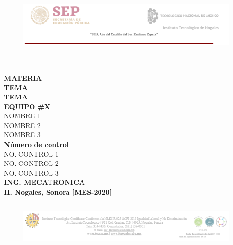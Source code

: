 \documentclass[hidelinks,12pt]{article}
\begin{document}
\begin{titlepage}
\begin{center}
\begin{figure}
	\includegraphics[width=17.5cm,height=3.3cm]{assets/images/00_HEADER}
\end{figure}
\vspace*{1\baselineskip}
{
	\bf{}\\
}
\vspace*{1\baselineskip}
\large{\textbf{MATERIA}}\\
\vspace*{1\baselineskip}
\large{\textbf{TEMA}}\\
\large{\textbf{TEMA}}\\
\vspace*{1\baselineskip}
\large{\textbf{EQUIPO \#X}}\\
NOMBRE 1\\
NOMBRE 2\\
NOMBRE 3\\
\vspace*{1\baselineskip}
\large{\textbf{Número de control}}\\
NO. CONTROL 1\\
NO. CONTROL 2\\
NO. CONTROL 3\\
\vspace*{1\baselineskip}
\large{\textbf{ING. MECATRONICA}}\\
\vspace*{8\baselineskip}
\large{
\textbf{H. Nogales, Sonora \hfill [MES-2020]}}\\
\vspace*{1\baselineskip}
\begin{figure}[h!]
	\includegraphics[width=17.01cm,height=2.46cm]{assets/images/00_FOOTER}
\end{figure}
\end{center}
\end{titlepage}
\restoregeometry
\end{document}
